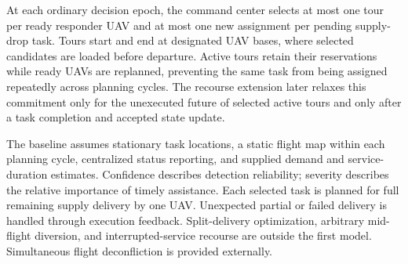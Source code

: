 \documentclass[conference]{IEEEtran}
\begin{document}
At each ordinary decision epoch, the command center selects at most one tour per ready responder UAV and at most one new assignment per pending supply-drop task. Tours start and end at designated UAV bases, where selected candidates are loaded before departure. Active tours retain their reservations while ready UAVs are replanned, preventing the same task from being assigned repeatedly across planning cycles. The recourse extension later relaxes this commitment only for the unexecuted future of selected active tours and only after a task completion and accepted state update.

The baseline assumes stationary task locations, a static flight map within each planning cycle, centralized status reporting, and supplied demand and service-duration estimates. Confidence describes detection reliability; severity describes the relative importance of timely assistance. Each selected task is planned for full remaining supply delivery by one UAV. Unexpected partial or failed delivery is handled through execution feedback. Split-delivery optimization, arbitrary mid-flight diversion, and interrupted-service recourse are outside the first model. Simultaneous flight deconfliction is provided externally.
\end{document}
